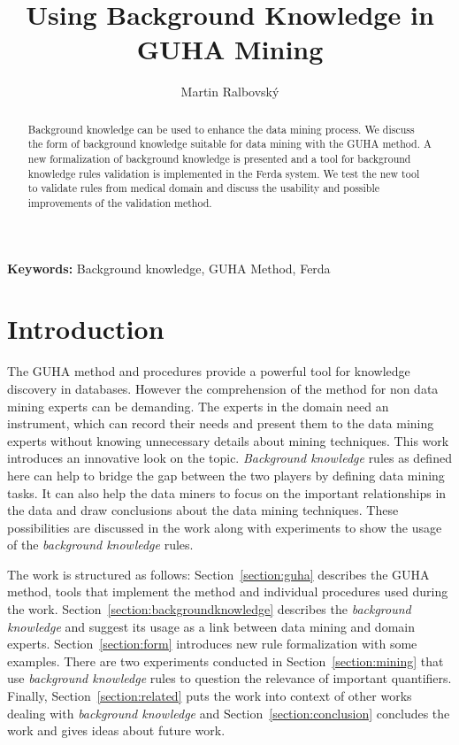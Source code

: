 \documentclass{llncs}
\title{Using Background Knowledge in GUHA Mining}
\author{Martin Ralbovsk\'{y}}
\institute{Department of Information and Knowledge Engineering,\\
University of Economics, Prague, W. Churchill Sq.~4, 130 67 Praha~3, Czech Republic
\\\email{martin.ralbovsky@gmail.com}}
\begin{document}
\maketitle

\begin{abstract}
Background knowledge can be used to enhance the data mining process. We discuss
the form of background knowledge suitable for data mining with the GUHA method.
A new formalization of background knowledge is presented and a tool for 
background knowledge rules validation is implemented in the Ferda system. We
test the new tool to validate rules from medical domain and discuss the usability
and possible improvements of the validation method. 
\end{abstract}

{\small {\bf Keywords:} Background knowledge, GUHA Method, Ferda}

\section{Introduction}

The GUHA method and procedures provide a powerful tool for knowledge discovery
in databases. However the comprehension of the method for non data mining
experts can be demanding. The experts in the domain need an instrument, which
can record their needs and present them to the data mining experts without 
knowing unnecessary details about mining techniques. This work introduces 
an innovative look on the topic. \emph{Background knowledge}
rules as defined here can help to bridge the gap between the two 
players by defining data mining tasks. It can also help the data miners
to focus on the important relationships in the data and draw conclusions
about the data mining techniques. These possibilities are discussed in the
work along with experiments to show the usage of the \emph{background knowledge}
rules. 

The work is structured as follows: Section~\ref{section:guha} describes the
GUHA method, tools that implement the method and individual procedures used during
the work. Section~\ref{section:backgroundknowledge} describes the \emph{background
knowledge} and suggest its usage as a link between data mining and domain experts.
Section~\ref{section:form} introduces new rule formalization with some examples.
There are two experiments conducted in Section~\ref{section:mining} that use
\emph{background knowledge} rules to question the relevance of important quantifiers.
Finally, Section~\ref{section:related} puts the work into context of other works
dealing with \emph{background knowledge} and Section~\ref{section:conclusion} concludes
the work and gives ideas about future work.
\end{document}
